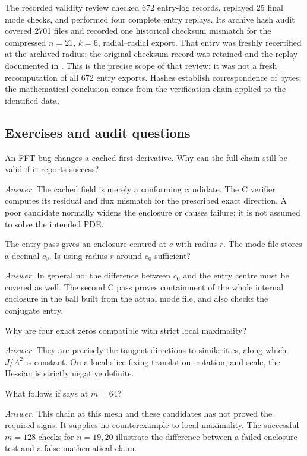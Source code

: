 The recorded validity review checked 672 entry-log records, replayed 25
final mode checks, and performed four complete entry replays. Its archive
hash audit covered 2701 files and recorded one historical checksum mismatch
for the compressed $n=21$, $k=6$, radial--radial export. That entry was
freshly recertified at the archived radius; the original checksum record
was retained and the replay documented in
.
This is the precise scope of that review: it was not a fresh recomputation
of all 672 entry exports. Hashes establish correspondence of bytes;
the mathematical conclusion comes from the verification chain applied
to the identified data.

\subsection*{Exercises and audit questions}
\begin{exercise}
An FFT bug changes a cached first derivative. Why can the full chain still
be valid if it reports success?
\end{exercise}
\noindent\emph{Answer.} The cached field is merely a conforming candidate.
The C verifier computes its residual and flux mismatch for the prescribed
exact direction. A poor candidate normally widens the enclosure or causes
failure; it is not assumed to solve the intended PDE.

\begin{exercise}
The entry pass gives an enclosure centred at $c$ with radius $r$. The mode
file stores a decimal $c_0$. Is using radius $r$ around $c_0$ sufficient?
\end{exercise}
\noindent\emph{Answer.} In general no: the difference between $c_0$ and the
entry centre must be covered as well. The second C pass proves containment
of the whole internal enclosure in the ball built from the actual mode
file, and also checks the conjugate entry.

\begin{exercise}
Why are four exact zeros compatible with strict local maximality?
\end{exercise}
\noindent\emph{Answer.} They are precisely the tangent directions to
similarities, along which $J/A^2$ is constant. On a local slice fixing
translation, rotation, and scale, the Hessian is strictly negative definite.

\begin{exercise}
What follows if  says  at $m=64$?
\end{exercise}
\noindent\emph{Answer.} This chain at this mesh and these candidates has
not proved the required signs. It supplies no counterexample to local
maximality. The successful $m=128$ checks for $n=19,20$ illustrate the
difference between a failed enclosure test and a false mathematical claim.
